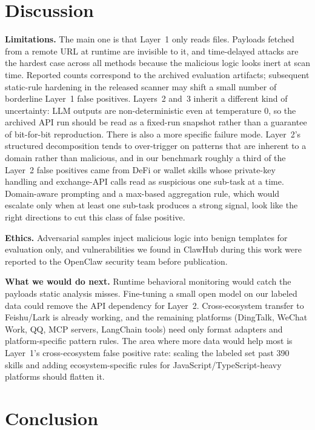 \documentclass[sigconf,nonacm]{acmart}
\begin{document}
\section{Discussion}
\label{sec:discussion}

\textbf{Limitations.} The main one is that Layer~1 only reads files. Payloads fetched from a remote URL at runtime are invisible to it, and time-delayed attacks are the hardest case across all methods because the malicious logic looks inert at scan time. Reported counts correspond to the archived evaluation artifacts; subsequent static-rule hardening in the released scanner may shift a small number of borderline Layer~1 false positives. Layers~2 and~3 inherit a different kind of uncertainty: LLM outputs are non-deterministic even at temperature 0, so the archived API run should be read as a fixed-run snapshot rather than a guarantee of bit-for-bit reproduction. There is also a more specific failure mode. Layer~2's structured decomposition tends to over-trigger on patterns that are inherent to a domain rather than malicious, and in our benchmark roughly a third of the Layer~2 false positives came from DeFi or wallet skills whose private-key handling and exchange-API calls read as suspicious one sub-task at a time. Domain-aware prompting and a max-based aggregation rule, which would escalate only when at least one sub-task produces a strong signal, look like the right directions to cut this class of false positive.

\textbf{Ethics.} Adversarial samples inject malicious logic into benign templates for evaluation only, and vulnerabilities we found in ClawHub during this work were reported to the OpenClaw security team before publication.

\textbf{What we would do next.} Runtime behavioral monitoring would catch the payloads static analysis misses. Fine-tuning a small open model on our labeled data could remove the API dependency for Layer~2. Cross-ecosystem transfer to Feishu/Lark is already working, and the remaining platforms (DingTalk, WeChat Work, QQ, MCP servers, LangChain tools) need only format adapters and platform-specific pattern rules. The area where more data would help most is Layer~1's cross-ecosystem false positive rate: scaling the labeled set past 390 skills and adding ecosystem-specific rules for JavaScript/TypeScript-heavy platforms should flatten it.

\section{Conclusion}
\label{sec:conclusion}
\end{document}
